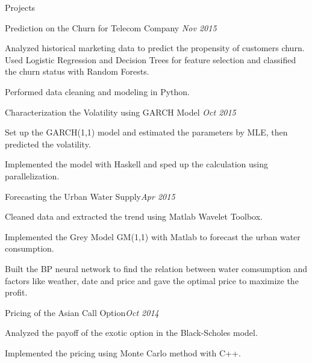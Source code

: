 \documentclass{resume} %
\begin{document}
\begin{rSection}{Projects}

\begin{rSubsection}{Prediction on the Churn for Telecom Company }{\em Nov 2015}{}{}
\item Analyzed historical marketing data to predict the propensity of customers churn. Used Logistic Regression and Decision Trees for feature selection and classified the churn status with Random Forests.
\item Performed data cleaning and modeling in Python.


\end{rSubsection}

\begin{rSubsection}{Characterization the Volatility using GARCH Model}{ \em Oct 2015}{}{}
\item Set up the GARCH(1,1) model and estimated the parameters by MLE, then predicted the volatility.
\item Implemented the model with Haskell and sped up the calculation using parallelization.
\end{rSubsection}

\begin{rSubsection}{Forecasting the Urban Water Supply}{\em Apr 2015}{}{}
\item Cleaned data and extracted the trend using Matlab Wavelet Toolbox.
\item Implemented the Grey Model GM(1,1) with Matlab to forecast the urban water consumption.
\item Built the BP neural network to find the relation between water comsumption and factors like weather, date and price and gave the optimal price to maximize the profit.

\end{rSubsection}
\begin{rSubsection}{Pricing of the Asian Call Option}{\em Oct 2014}{}{}
\item Analyzed the payoff of the exotic option in the Black-Scholes model.
\item Implemented the pricing using Monte Carlo method with C++.
\end{rSubsection}

\end{rSection}



\end{document}
